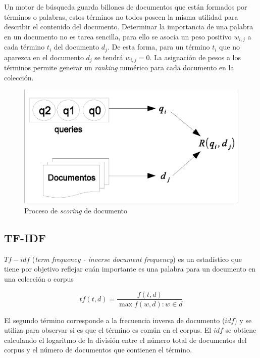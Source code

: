 Un motor de búsqueda guarda billones de documentos que están formados por términos o palabras, estos términos no todos poseen la misma utilidad para describir el contenido del documento. Determinar la importancia de una palabra en un documento no es tarea sencilla, para ello se asocia un peso positivo $w_{i,j}$ a cada término $t_{i}$ del documento $d_{j}$. De esta forma, para un término $t_{i}$ que no aparezca en el documento $d_{j}$ se tendrá $w_{i,j} = 0$. La asignación de pesos a los términos permite generar un \textit{ranking} numérico para cada documento en la colección.

\begin{figure}[!th]
\centering
\includegraphics[scale=.75]{images/ranking_process.eps}
\caption{Proceso de \textit{scoring} de documento}
\label{fig:ranking_process}
\end{figure}

\subsection{TF-IDF}
\label{marco:tfi-df}
$Tf-idf$ (\textit{term frequency - inverse document frequency}) es un estadístico que tiene por objetivo reflejar cuán importante es una palabra para un documento en una colección o corpus %

\begin{equation}
\label{formula:tf}
tf(t,d) = \dfrac{f(t,d) }{ \max{f(w,d) : w \in d}}
\end{equation}

El segundo término corresponde a la frecuencia inversa de documento ($idf$) y se utiliza para observar si es que el término es común en el corpus. El $idf$ se obtiene calculando el logaritmo de la división entre el número total de documentos del corpus y el número de documentos que contienen el término.

